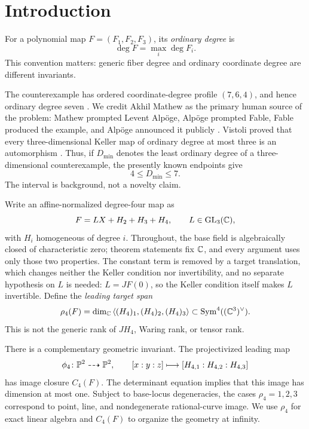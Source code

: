 \documentclass[11pt,reqno]{amsart}
\begin{document}
\section{Introduction}
\label{sec:introduction}

For a polynomial map \(F=(F_1,F_2,F_3)\), its \emph{ordinary degree} is
\[
\deg F=\max_i\deg F_i.
\]
This convention matters: generic fiber degree and ordinary coordinate degree
are different invariants.

The counterexample has ordered coordinate-degree profile \((7,6,4)\), and
hence ordinary degree seven
\cite{alpoge2026announcement,tao2026digestion}.  We credit Akhil Mathew as
the primary human source of the problem: Mathew prompted Levent Alp\"oge,
Alp\"oge prompted Fable, Fable produced the example, and Alp\"oge announced
it publicly \cite{ulam2026counterexample}.  Vistoli proved that every
three-dimensional Keller map of ordinary degree at most three is an
automorphism \cite{vistoli1999}.  Thus, if \(D_{\min}\) denotes the least
ordinary degree of a three-dimensional counterexample, the presently known
endpoints give
\[
4\le D_{\min}\le7.
\]
The interval is background, not a novelty claim.

Write an affine-normalized degree-four map as
\begin{equation}
\label{eq:homogeneous}
F=LX+H_2+H_3+H_4,
\qquad L\in\operatorname{GL}_3(\mathbb C),
\end{equation}
with \(H_i\) homogeneous of degree \(i\).  Throughout, the base field is
algebraically closed of characteristic zero; theorem statements fix
\(\mathbb C\), and every argument uses only those two properties.  The constant
term is removed by a target translation, which changes neither the Keller
condition nor invertibility, and no separate hypothesis on \(L\) is
needed: \(L=JF(0)\), so the Keller condition itself makes \(L\)
invertible.  Define the \emph{leading target
span}
\begin{equation}
\label{eq:rho}
\rho_4(F)=
\dim_{\mathbb C}\left\langle(H_4)_1,(H_4)_2,(H_4)_3\right\rangle
\subset \operatorname{Sym}^4((\mathbb C^3)^\vee).
\end{equation}
This is not the generic rank of \(JH_4\), Waring rank, or tensor rank.

There is a complementary geometric invariant.  The projectivized leading
map
\[
\phi_4\colon\mathbb P^2\dashrightarrow\mathbb P^2,\qquad
[x:y:z]\longmapsto[H_{4,1}:H_{4,2}:H_{4,3}]
\]
has image closure \(C_4(F)\).  The determinant equation implies that this
image has dimension at most one.  Subject to base-locus degeneracies, the
cases \(\rho_4=1,2,3\) correspond to point, line, and nondegenerate
rational-curve image.  We use \(\rho_4\) for exact linear algebra and
\(C_4(F)\) to organize the geometry at infinity.
\end{document}
